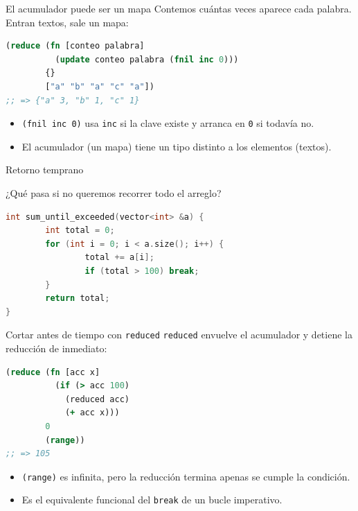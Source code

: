 \documentclass{beamer}
\begin{document}
\begin{frame}[fragile]{El acumulador puede ser un mapa}
    Contemos cuántas veces aparece cada palabra. Entran textos, sale un mapa:

    \begin{lstlisting}[language=Clojure]
(reduce (fn [conteo palabra]
          (update conteo palabra (fnil inc 0)))
        {}
        ["a" "b" "a" "c" "a"])
;; => {"a" 3, "b" 1, "c" 1}
    \end{lstlisting}

    \begin{itemize}
        \item \texttt{(fnil inc 0)} usa \texttt{inc} si la clave existe y arranca en \texttt{0} si todavía no.
        \item El acumulador (un mapa) tiene un tipo distinto a los elementos (textos).
    \end{itemize}
\end{frame}

\begin{frame}[fragile]{Retorno temprano}
\begin{Block}
¿Qué pasa si no queremos recorrer todo el arreglo?
\end{Block}
 \begin{lstlisting}[language=cpp]
 int sum_until_exceeded(vector<int> &a) {
        int total = 0;
        for (int i = 0; i < a.size(); i++) {
                total += a[i];
                if (total > 100) break;
        }
        return total;
}
 \end{lstlisting}
\end{frame}

\begin{frame}[fragile]{Cortar antes de tiempo con \texttt{reduced}}
    \texttt{reduced} envuelve el acumulador y detiene la reducción de inmediato:

    \begin{lstlisting}[language=Clojure]
(reduce (fn [acc x]
          (if (> acc 100)
            (reduced acc)
            (+ acc x)))
        0
        (range))
;; => 105
    \end{lstlisting}

    \begin{itemize}
        \item \texttt{(range)} es infinita, pero la reducción termina apenas se cumple la condición.
        \item Es el equivalente funcional del \texttt{break} de un bucle imperativo.
    \end{itemize}
\end{frame}
\end{document}
